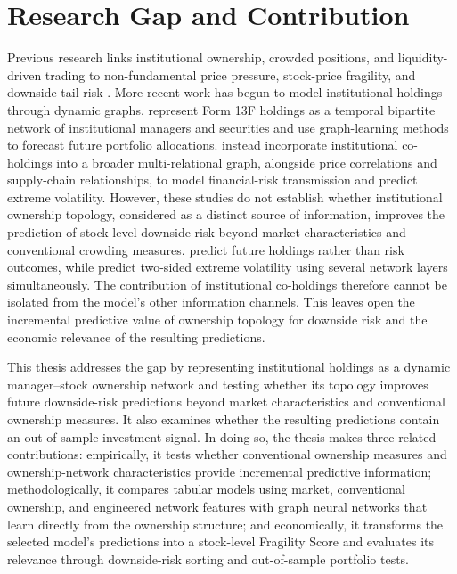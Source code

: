 \section{Research Gap and Contribution}
\label{sec:research_gap}

Previous research links institutional ownership, crowded positions, and liquidity-driven trading to non-fundamental price pressure, stock-price fragility, and downside tail risk \parencite{coval2007asset,greenwood2011stock,brown2022crowded}. More recent work has begun to model institutional holdings through dynamic graphs. \Textcite{izadifar2026institutional} represent Form 13F holdings as a temporal bipartite network of institutional managers and securities and use graph-learning methods to forecast future portfolio allocations. \Textcite{tagndynamic2026} instead incorporate institutional co-holdings into a broader multi-relational graph, alongside price correlations and supply-chain relationships, to model financial-risk transmission and predict extreme volatility. However, these studies do not establish whether institutional ownership topology, considered as a distinct source of information, improves the prediction of stock-level downside risk beyond market characteristics and conventional crowding measures. \Textcite{izadifar2026institutional} predict future holdings rather than risk outcomes, while \textcite{tagndynamic2026} predict two-sided extreme volatility using several network layers simultaneously. The contribution of institutional co-holdings therefore cannot be isolated from the model's other information channels. This leaves open the incremental predictive value of ownership topology for downside risk and the economic relevance of the resulting predictions.

This thesis addresses the gap by representing institutional holdings as a dynamic manager--stock ownership network and testing whether its topology improves future downside-risk predictions beyond market characteristics and conventional ownership measures. It also examines whether the resulting predictions contain an out-of-sample investment signal. In doing so, the thesis makes three related contributions: empirically, it tests whether conventional ownership measures and ownership-network characteristics provide incremental predictive information; methodologically, it compares tabular models using market, conventional ownership, and engineered network features with graph neural networks that learn directly from the ownership structure; and economically, it transforms the selected model's predictions into a stock-level Fragility Score and evaluates its relevance through downside-risk sorting and out-of-sample portfolio tests.